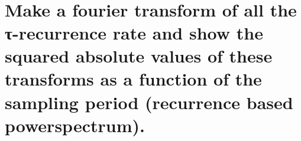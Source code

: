 \documentclass[11pt]{article}
\begin{document}
    \begin{center}
    \end{center}
    { \hspace*{\fill} \\}
    
    \hypertarget{make-a-fourier-transform-of-all-the-ux3c4-recurrence-rate-and-show-the-squared-absolute-values-of-these-transforms-as-a-function-of-the-sampling-period-recurrence-based-powerspectrum.}{%
\section{Make a fourier transform of all the τ-recurrence rate and show
the squared absolute values of these transforms as a function of the
sampling period (recurrence based
powerspectrum).}\label{make-a-fourier-transform-of-all-the-ux3c4-recurrence-rate-and-show-the-squared-absolute-values-of-these-transforms-as-a-function-of-the-sampling-period-recurrence-based-powerspectrum.}}
\end{document}
